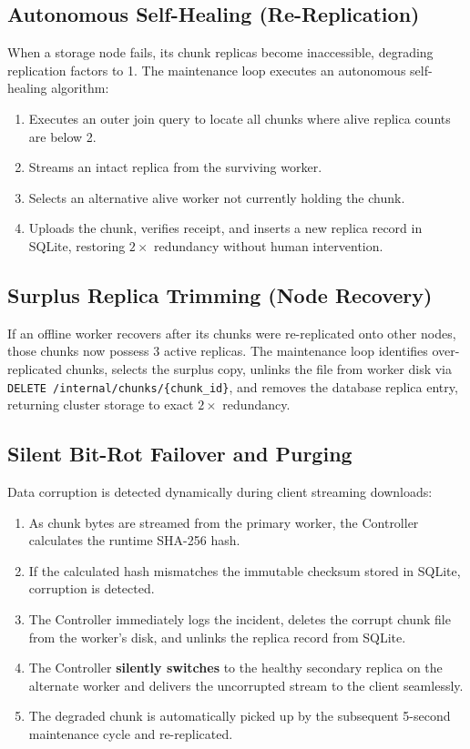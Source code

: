 \documentclass[11pt,a4paper]{article}
\begin{document}
\subsection{Autonomous Self-Healing (Re-Replication)}
When a storage node fails, its chunk replicas become inaccessible, degrading replication factors to 1. The maintenance loop executes an autonomous self-healing algorithm:
\begin{enumerate}[noitemsep]
    \item Executes an outer join query to locate all chunks where alive replica counts are below 2.
    \item Streams an intact replica from the surviving worker.
    \item Selects an alternative alive worker not currently holding the chunk.
    \item Uploads the chunk, verifies receipt, and inserts a new replica record in SQLite, restoring $2\times$ redundancy without human intervention.
\end{enumerate}

\subsection{Surplus Replica Trimming (Node Recovery)}
If an offline worker recovers after its chunks were re-replicated onto other nodes, those chunks now possess 3 active replicas. The maintenance loop identifies over-replicated chunks, selects the surplus copy, unlinks the file from worker disk via \texttt{DELETE /internal/chunks/\{chunk\_id\}}, and removes the database replica entry, returning cluster storage to exact $2\times$ redundancy.

\subsection{Silent Bit-Rot Failover and Purging}
Data corruption is detected dynamically during client streaming downloads:
\begin{enumerate}[noitemsep]
    \item As chunk bytes are streamed from the primary worker, the Controller calculates the runtime SHA-256 hash.
    \item If the calculated hash mismatches the immutable checksum stored in SQLite, corruption is detected.
    \item The Controller immediately logs the incident, deletes the corrupt chunk file from the worker's disk, and unlinks the replica record from SQLite.
    \item The Controller \textbf{silently switches} to the healthy secondary replica on the alternate worker and delivers the uncorrupted stream to the client seamlessly.
    \item The degraded chunk is automatically picked up by the subsequent 5-second maintenance cycle and re-replicated.
\end{enumerate}
\end{document}
